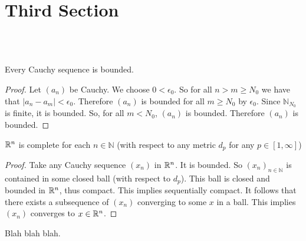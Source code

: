 \documentclass[10pt]{article}
\begin{document}
\section*{Third Section} 
\\\\
\begin{lemma}
    Every Cauchy sequence is bounded.
\end{lemma}
\begin{proof}
    Let $(a_{n})$ be Cauchy. We choose $ 0<\epsilon_{0}$. So for all $ n>m\geq N_{0}$ we have that $\vert a_{n}-a_{m} \vert < \epsilon_{0}$. Therefore $(a_{n})$ is bounded for all $ m \geq N_{0} $ by $ \epsilon_{0} $. Since $ \mathbb{N}_{N_{0}}$ is finite, it is bounded. So, for all $ m<N_{0} $, $ (a_{n})$ is bounded. Therefore $(a_{n})$ is bounded.
\end{proof}
\begin{theorem}
    $\mathbb{R}^n$ is complete for each $n\in \mathbb{N}$ (with respect to any metric $d_p$ for any $p\in[1,\infty]$)
\end{theorem}
\begin{proof}
    Take any Cauchy sequence $(x_n)$ in $\mathbb{R}^n$. It is bounded. So $(x_n)_{n\in \mathbb{N}}$ is contained in some closed ball (with respect to $d_p$). This ball is closed and bounded in $\mathbb{R}^n$, thus compact. This implies sequentially compact. It follows that there exists a subsequence of $(x_n)$ converging to some $x$ in a ball. This implies $(x_n)$ converges to $x\in\mathbb{R}^n$.
\end{proof}
\begin{proposition}
    Blah blah blah.
\end{proposition}
\end{document}
